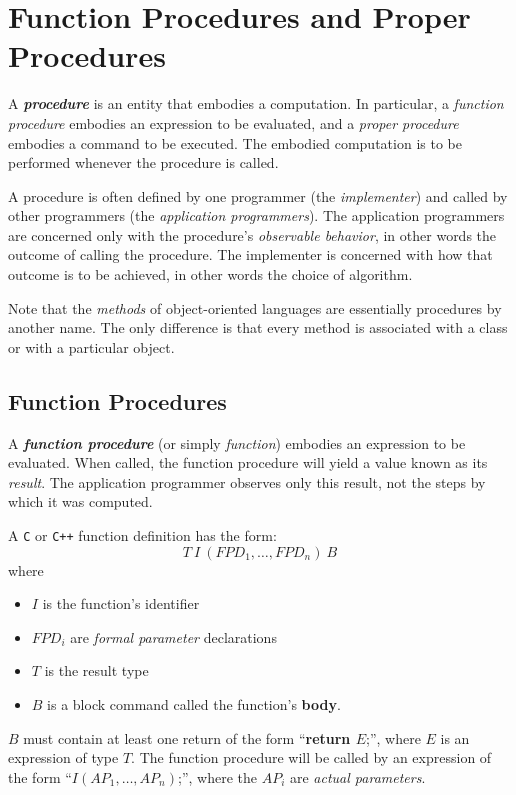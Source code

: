\section{Function Procedures and Proper Procedures}

A \textit{\textbf{procedure}} is an entity that embodies a computation. In particular, a \textit{function procedure} embodies an expression to be evaluated, and a \textit{proper procedure} embodies a command to be executed. The embodied computation is to be performed whenever the procedure is called.

A procedure is often defined by one programmer (the \textit{implementer}) and called by other programmers (the \textit{application programmers}). The application programmers are concerned only with the procedure's \textit{observable behavior}, in other words the outcome of calling the procedure. The implementer is concerned with how that outcome is to be achieved, in other words the choice of algorithm.

Note that the \textit{methods} of object-oriented languages are essentially procedures by another name. The only difference is that every method is associated with a class or with a particular object.

\subsection{Function Procedures}

A \textit{\textbf{function procedure}} (or simply \textit{function}) embodies an expression to be evaluated. When called, the function procedure will yield a value known as its \textit{result}. The application programmer observes only this result, not the steps by which it was computed.

\vspace*{\fill}
\columnbreak

\noindent A \texttt{C} or \texttt{C++} function definition has the form:
\begin{equation*}
  T\ I\ (FPD_1, \ldots, FPD_n)\ B
\end{equation*}
where
\begin{itemize}
  \item $I$ is the function’s identifier
  \item $FPD_i$ are \textit{formal parameter} declarations
  \item $T$ is the result type
  \item $B$ is a block command called the function's \textbf{body}.
\end{itemize}  
$B$ must contain at least one return of the form ``\textbf{return $E$};'', where $E$ is an expression of type $T$. The function procedure will be called by an expression of the form ``$I(AP_1, \ldots, AP_n)$;'', where the $AP_i$ are \textit{actual parameters}.

